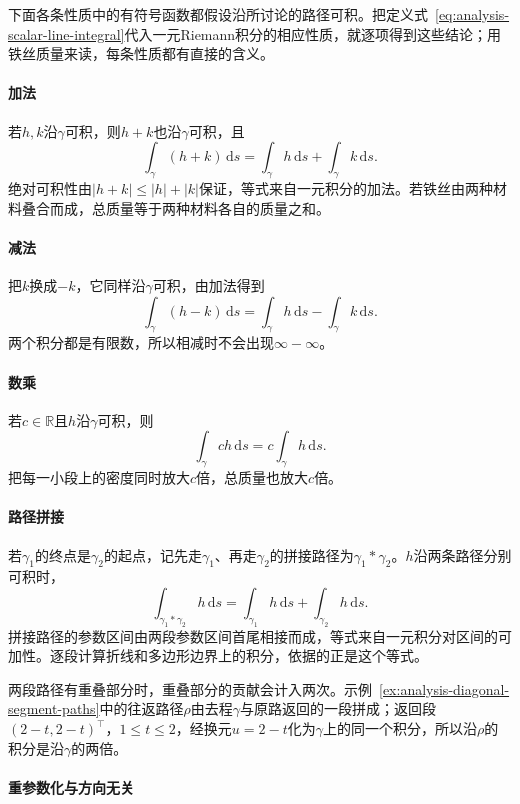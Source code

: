 下面各条性质中的有符号函数都假设沿所讨论的路径可积。把定义式~\eqref{eq:analysis-scalar-line-integral}代入一元Riemann积分的相应性质，就逐项得到这些结论；用铁丝质量来读，每条性质都有直接的含义。

\paragraph{加法}

若$h,k$沿$\gamma$可积，则$h+k$也沿$\gamma$可积，且
\[
 \int_\gamma(h+k)\,\mathrm ds=\int_\gamma h\,\mathrm ds+\int_\gamma k\,\mathrm ds.
\]
绝对可积性由$|h+k|\leq|h|+|k|$保证，等式来自一元积分的加法。若铁丝由两种材料叠合而成，总质量等于两种材料各自的质量之和。

\paragraph{减法}

把$k$换成$-k$，它同样沿$\gamma$可积，由加法得到
\[
 \int_\gamma(h-k)\,\mathrm ds=\int_\gamma h\,\mathrm ds-\int_\gamma k\,\mathrm ds.
\]
两个积分都是有限数，所以相减时不会出现$\infty-\infty$。

\paragraph{数乘}

若$c\in\mathbb R$且$h$沿$\gamma$可积，则
\[
 \int_\gamma ch\,\mathrm ds=c\int_\gamma h\,\mathrm ds.
\]
把每一小段上的密度同时放大$c$倍，总质量也放大$c$倍。

\paragraph{路径拼接}

若$\gamma_1$的终点是$\gamma_2$的起点，记先走$\gamma_1$、再走$\gamma_2$的拼接路径为$\gamma_1*\gamma_2$。$h$沿两条路径分别可积时，
\[
 \int_{\gamma_1*\gamma_2}h\,\mathrm ds
 =\int_{\gamma_1}h\,\mathrm ds+\int_{\gamma_2}h\,\mathrm ds.
\]
拼接路径的参数区间由两段参数区间首尾相接而成，等式来自一元积分对区间的可加性。逐段计算折线和多边形边界上的积分，依据的正是这个等式。

两段路径有重叠部分时，重叠部分的贡献会计入两次。示例~\ref{ex:analysis-diagonal-segment-paths}中的往返路径$\rho$由去程$\gamma$与原路返回的一段拼成；返回段$(2-t,2-t)^\top$，$1\leq t\leq2$，经换元$u=2-t$化为$\gamma$上的同一个积分，所以沿$\rho$的积分是沿$\gamma$的两倍。

\paragraph{重参数化与方向无关}

